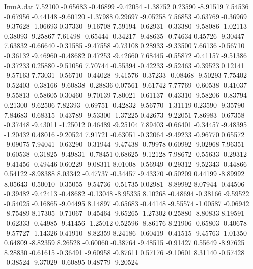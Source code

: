 \begin{filecontents}{ImuA.dat}
   7.52100   -0.65683   -0.46899   -9.42054   -1.38752    0.23590   -8.91519
   7.54536   -0.67956   -0.44148   -9.60120   -1.37988    0.29697   -9.05258
   7.56853   -0.63769   -0.36969   -9.37628   -1.06693    0.37330   -9.16708
   7.59194   -0.62931   -0.33380   -9.58086   -1.02113    0.38093   -9.25867
   7.61498   -0.65444   -0.34217   -9.48635   -0.74634    0.45726   -9.30447
   7.63832   -0.66640   -0.31585   -9.47558   -0.73108    0.28933   -9.33500
   7.66136   -0.56710   -0.36132   -9.46960   -0.48682    0.47253   -9.42660
   7.68445   -0.55872   -0.41157   -9.51386   -0.37233    0.25880   -9.51056
   7.70744   -0.55394   -0.42233   -9.52463   -0.39523    0.12141   -9.57163
   7.73031   -0.56710   -0.44028   -9.41576   -0.37233   -0.08468   -9.50293
   7.75402   -0.52403   -0.38166   -9.60838   -0.28836    0.07561   -9.61742
   7.77769   -0.60538   -0.41037   -9.55813   -0.58605    0.30460   -9.70139
   7.80021   -0.61137   -0.43310   -9.58206   -0.83794    0.21300   -9.62506
   7.82393   -0.69751   -0.42832   -9.56770   -1.31119    0.23590   -9.35790
   7.84683   -0.68315   -0.43789   -9.53300   -1.37225    0.42673   -9.22051
   7.86983   -0.67358   -0.37448   -9.43011   -1.25012    0.46489   -9.25104
   7.89403   -0.66401   -0.34457   -9.48395   -1.20432    0.48016   -9.20524
   7.91721   -0.63051   -0.32064   -9.49233   -0.96770    0.65572   -9.09075
   7.94041   -0.63290   -0.31944   -9.47438   -0.79978    0.60992   -9.02968
   7.96351   -0.60538   -0.31825   -9.49831   -0.78451    0.68625   -9.12128
   7.98672   -0.55633   -0.29312   -9.41456   -0.49446    0.60229   -9.08311
   8.01008   -0.56949   -0.29312   -9.52343   -0.44866    0.54122   -8.98388
   8.03342   -0.47737   -0.34457   -9.43370   -0.50209    0.44199   -8.89992
   8.05643   -0.50010   -0.35055   -9.54736   -0.51735    0.02981   -8.89992
   8.07944   -0.44506   -0.39482   -9.42413   -0.48682   -0.13048   -8.95335
   8.10268   -0.48694   -0.38166   -9.59522   -0.54025   -0.16865   -9.04495
   8.14897   -0.65683   -0.44148   -9.55574   -1.00587   -0.06942   -8.75489
   8.17305   -0.71067   -0.45464   -9.65265   -1.27302    0.25880   -8.80833
   8.19591   -0.62333   -0.44985   -9.41456   -1.25012    0.52596   -8.86176
   8.21906   -0.65803   -0.40678   -9.57727   -1.14326    0.41910   -8.82359
   8.24186   -0.60419   -0.41515   -9.45763   -1.01350    0.64809   -8.82359
   8.26528   -0.60060   -0.38764   -9.48515   -0.91427    0.55649   -8.97625
   8.28830   -0.61615   -0.36491   -9.60958   -0.87611    0.57176   -9.10601
   8.31140   -0.57428   -0.38524   -9.37029   -0.60895    0.48779   -9.20524

\end{filecontents}
